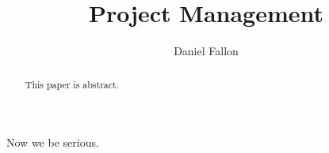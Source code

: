 \documentclass[conference]{IEEEtran}
\title{Project Management\\\normalsize{}}
\author{Daniel Fallon}
\begin{document}
\maketitle

\begin{abstract}
This paper is abstract.
\end{abstract}

Now we be serious. \cite{hc_washingtonpost}


\end{document}
